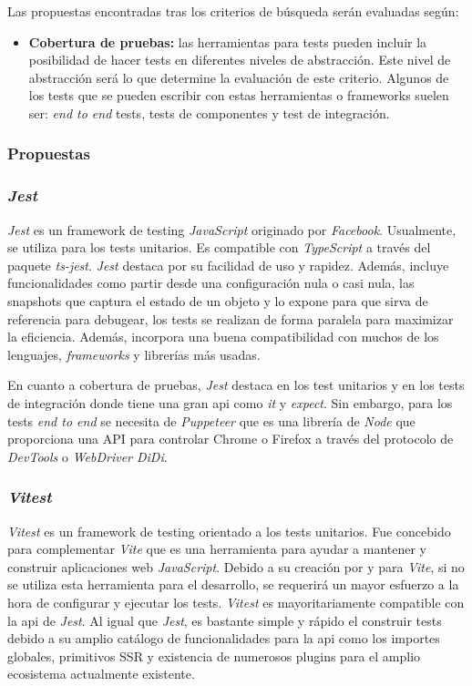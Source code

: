 Las propuestas encontradas tras los criterios de búsqueda serán evaluadas según:

\begin{itemize}
    \item \textbf{Cobertura de pruebas:} las herramientas para tests pueden incluir la posibilidad de hacer tests en diferentes niveles de abstracción. Este nivel de abstracción será lo que determine la evaluación de este criterio. Algunos de los tests que se pueden escribir con estas herramientas o frameworks suelen ser: \textit{end to end} tests, tests de componentes y test de integración.
\end{itemize}

\subsubsection{Propuestas}

\subsubsection{\textit{Jest}}

\textit{Jest} es un framework de testing \textit{JavaScript} originado por \textit{Facebook}. Usualmente, se utiliza para los tests unitarios. Es compatible con \textit{TypeScript} a través del paquete \textit{ts-jest}. \textit{Jest} destaca por su facilidad de uso y rapidez. Además, incluye funcionalidades como partir desde una configuración nula o casi nula, las snapshots que captura el estado de un objeto y lo expone para que sirva de referencia para debugear, los tests se realizan de forma paralela para maximizar la eficiencia. Además, incorpora una buena compatibilidad con muchos de los lenguajes, \textit{frameworks} y librerías más usadas.

En cuanto a cobertura de pruebas, \textit{Jest} destaca en los test unitarios y en los tests de integración donde tiene una gran api como \textit{it} y \textit{expect}. Sin embargo, para los tests \textit{end to end} se necesita de \textit{Puppeteer} que es una librería de \textit{Node} que proporciona una API para controlar Chrome o Firefox a través del protocolo de \textit{DevTools} o \textit{WebDriver DiDi}.

\subsubsection{\textit{Vitest}}

\textit{Vitest} es un framework de testing orientado a los tests unitarios. Fue concebido para complementar \textit{Vite} que es una herramienta para ayudar a mantener y construir aplicaciones web \textit{JavaScript}. Debido a su creación por y para \textit{Vite}, si no se utiliza esta herramienta para el desarrollo, se requerirá un mayor esfuerzo a la hora de configurar y ejecutar los tests. \textit{Vitest} es mayoritariamente compatible con la api de \textit{Jest}. Al igual que \textit{Jest}, es bastante simple y rápido el construir tests debido a su amplio catálogo de funcionalidades para la api como los importes globales, primitivos SSR y existencia de numerosos plugins para el amplio ecosistema actualmente existente.

